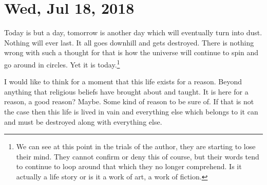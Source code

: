 \section{Wed, Jul 18, 2018}

Today is but a day, tomorrow is another day which will eventually turn into
dust. Nothing will ever last. It all goes downhill and gets destroyed. There is
nothing wrong with such a thought for that is how the universe will continue to
spin and go around in circles. Yet it is today.\footnote{
We can see at this point in the trials of the author, they are starting to lose
their mind. They cannot confirm or deny this of course, but their words tend to
continue to loop around that which they no longer comprehend. Is it actually a
life story or is it a work of art, a work of fiction.
}

I would like to think for a moment that this life exists for a reason. Beyond
anything that religious beliefs have brought about and taught. It is here for a
reason, a good reason? Maybe. Some kind of reason to be sure of. If that is not
the case then this life is lived in vain and everything else which belongs to it
can and must be destroyed along with everything else.